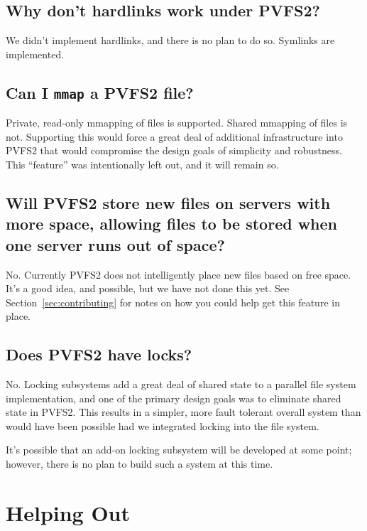 \documentclass[11pt,letterpaper]{article}
\begin{document}
\subsection{Why don't hardlinks work under PVFS2?}

We didn't implement hardlinks, and there is no plan to do so.  Symlinks are
implemented.

\subsection{Can I \texttt{mmap} a PVFS2 file?}

Private, read-only mmapping of files is supported.  Shared mmapping of files
is not.  Supporting this would force a great deal of additional infrastructure
into PVFS2 that would compromise the design goals of simplicity and
robustness.  This ``feature'' was intentionally left out, and it will remain
so.

\subsection{Will PVFS2 store new files on servers with more space, allowing
            files to be stored when one server runs out of space?}

No.  Currently PVFS2 does not intelligently place new files based on free
space.  It's a good idea, and possible, but we have not done this yet.  See
Section~\ref{sec:contributing} for notes on how you could help get this
feature in place.

\subsection{Does PVFS2 have locks?}

No.  Locking subsystems add a great deal of shared state to a parallel file 
system implementation, and one of the primary design goals was to eliminate
shared state in PVFS2.  This results in a simpler, more fault tolerant
overall system than would have been possible had we integrated locking into
the file system.

It's possible that an add-on locking subsystem will be developed at some point;
however, there is no plan to build such a system at this time.

%
%
\section{Helping Out}
\end{document}
